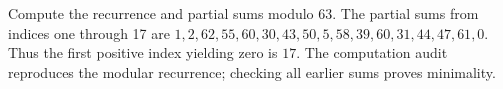 Compute the recurrence and partial sums modulo 63. The partial sums from indices one through 17 are $1,2,62,55,60,30,43,50,5,58,39,60,31,44,47,61,0$. Thus the first positive index yielding zero is $\boxed{17}$. The computation audit reproduces the modular recurrence; checking all earlier sums proves minimality.
